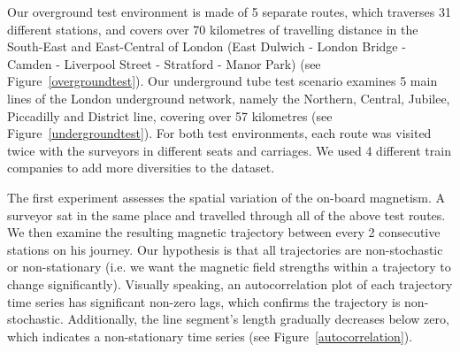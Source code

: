 \documentclass[conference]{IEEEtran}
\begin{document}
Our overground test environment is made of 5 separate routes, which traverses 31 different stations, and covers over 70 kilometres of travelling distance in the South-East and East-Central of London (East Dulwich - London Bridge - Camden - Liverpool Street - Stratford - Manor Park) (see Figure~\ref{overgroundtest}). Our underground tube test scenario examines 5 main lines of the London underground network, namely the Northern, Central, Jubilee, Piccadilly and District line, covering over 57 kilometres (see Figure~\ref{undergroundtest}). For both test environments, each route was visited twice with the surveyors in different seats and carriages. We used 4 different train companies to add more diversities to the dataset.

The first experiment assesses the spatial variation of the on-board magnetism. A surveyor sat in the same place and travelled through all of the above test routes. We then examine the resulting magnetic trajectory between every 2 consecutive stations on his journey. Our hypothesis is that all trajectories are non-stochastic or non-stationary (i.e. we want the magnetic field strengths within a trajectory to change significantly). Visually speaking, an autocorrelation plot of each trajectory time series has significant non-zero lags, which confirms the trajectory is non-stochastic. Additionally, the line segment's length gradually decreases below zero, which indicates a non-stationary time series (see Figure~\ref{autocorrelation}).
\end{document}
